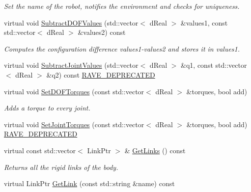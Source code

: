 \begin{DoxyCompactItemize}
\begin{DoxyCompactList}\small\item\em Set the name of the robot, notifies the environment and checks for uniqueness. \item\end{DoxyCompactList}\item 
virtual void \hyperlink{classOpenRAVE_1_1KinBody_a7c60c9dfe8ef533913967e60f3d7db8f}{SubtractDOFValues} (std::vector$<$ dReal $>$ \&values1, const std::vector$<$ dReal $>$ \&values2) const 
\begin{DoxyCompactList}\small\item\em Computes the configuration difference values1-\/values2 and stores it in values1. \item\end{DoxyCompactList}\item 
virtual void \hyperlink{classOpenRAVE_1_1KinBody_a4b35aa1ab1b6538d151f7f6cb254c5fe}{SubtractJointValues} (std::vector$<$ dReal $>$ \&q1, const std::vector$<$ dReal $>$ \&q2) const \hyperlink{namespaceOpenRAVE_af23fc4c2c72950a8c02f38ef71680bc6}{RAVE\_\-DEPRECATED}
\item 
virtual void \hyperlink{classOpenRAVE_1_1KinBody_a4057204a0e2c01a59ea9011fb5bba922}{SetDOFTorques} (const std::vector$<$ dReal $>$ \&torques, bool add)
\begin{DoxyCompactList}\small\item\em Adds a torque to every joint. \item\end{DoxyCompactList}\item 
virtual void \hyperlink{classOpenRAVE_1_1KinBody_aba8aaffd5d9bb4c604eb29a0250bd525}{SetJointTorques} (const std::vector$<$ dReal $>$ \&torques, bool add) \hyperlink{namespaceOpenRAVE_af23fc4c2c72950a8c02f38ef71680bc6}{RAVE\_\-DEPRECATED}
\item 
\hypertarget{classOpenRAVE_1_1KinBody_a32ba11c03aabb873b3e503c8e5b93e53}{
virtual const std::vector$<$ LinkPtr $>$ \& \hyperlink{classOpenRAVE_1_1KinBody_a32ba11c03aabb873b3e503c8e5b93e53}{GetLinks} () const }
\label{classOpenRAVE_1_1KinBody_a32ba11c03aabb873b3e503c8e5b93e53}

\begin{DoxyCompactList}\small\item\em Returns all the rigid links of the body. \item\end{DoxyCompactList}\item 
\hypertarget{classOpenRAVE_1_1KinBody_a9953fafff72cdb7abf421255bbe2fa12}{
virtual LinkPtr \hyperlink{classOpenRAVE_1_1KinBody_a9953fafff72cdb7abf421255bbe2fa12}{GetLink} (const std::string \&name) const }
\label{classOpenRAVE_1_1KinBody_a9953fafff72cdb7abf421255bbe2fa12}


\end{DoxyCompactItemize}
